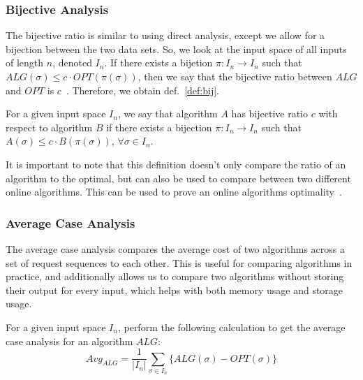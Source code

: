 \subsubsection*{Bijective Analysis}
\label{sec:Bij}
The bijective ratio is similar to using direct analysis, except we allow for a bijection between the two data sets. So, we look at the input space of all inputs of length $n$, denoted $I_n$. If there exists a bijetion $\pi:I_n \rightarrow I_n$ such that $ALG(\sigma) \leq c\cdot OPT(\pi(\sigma))$, then  we say that the bijective ratio between $ALG$ and $OPT$ is $c$~\cite{bij2016}. Therefore, we obtain def.~\ref{def:bij}. 

\begin{definition}
    \label{def:bij}
    For a given input space $I_n$, we say that algorithm $A$ has bijective ratio $c$ with respect to algorithm $B$ if there exists a bijection $\pi:I_n \rightarrow I_n$ such that $A(\sigma) \leq c\cdot B(\pi(\sigma))$, $\forall \sigma \in I_n$. 
\end{definition}

It is important to note that this definition doesn't only compare the ratio of an algorithm to the optimal, but can also be used to compare between two different online algorithms. This can be used to prove an online algorithms optimality~\cite{bij2016}.

\subsubsection*{Average Case Analysis}
\label{sec:Avg}
The average case analysis compares the average cost of two algorithms across a set of request sequences to each other. This is useful for comparing algorithms in practice, and additionally allows us to compare two algorithms without storing their output for every input, which helps with both memory usage and storage usage.

\begin{definition}
    \label{def:avg}
    For a given input space $I_n$, perform the following calculation to get the average case analysis for an algorithm $ALG$: 
    \begin{equation*}
        Avg_{ALG} = \frac{1}{|I_n|}\sum_{\sigma \in I_n} \{ALG(\sigma) - OPT(\sigma)\}
    \end{equation*}
\end{definition}